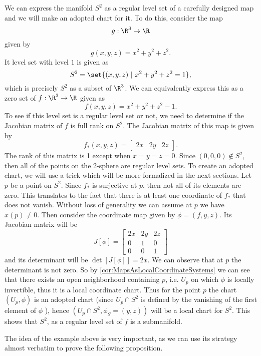 \begin{example}[$ S^2 $ in $ \R^3 $]
	We can express the manifold $ S^2 $ as a regular level set of a carefully designed map and we will make an adopted chart for it. To do this, consider the map
	\[ g: \R^3 \to \R \] 
	given by
	\[ g(x,y,z) = x^2+y^2+z^2 . \]
	It level set with level $ 1 $ is given as
	\[ S^2 = \set{(x,y,z)\ |\ x^2+y^2+z^2 = 1}, \]
	which is precisely $ S^2 $ as a subset of $ \R^3 $. We can equivalently express this as a zero set of $ f: \R^3 \to \R $  given as
	\[ f(x,y,z) = x^2+y^2+z^2 - 1. \]
	To see if this level set is a regular level set or not, we need to determine if the Jacobian matrix of $ f $ is full rank on $ S^2 $. The Jacobian matrix of this map is given by
	\[ f_*(x,y,z) =  \begin{bmatrix}
		2x & 2y & 2z
	\end{bmatrix}. \]
	The rank of this matrix is 1 except when $ x=y=z=0 $. Since $ (0,0,0) \notin S^2 $, then all of the points on the 2-sphere are regular level sets. To create an adopted chart, we will use a trick which will be more formalized in the next sections. Let $ p $ be a point on $ S^2 $. Since $f_*  $ is surjective at $ p $, then not all of its elements are zero. This translates to the fact that there is at least one coordinate of $ f_* $ that does not vanish. Without loss of generality we can assume at $ p $ we have $ x(p) \neq 0 $. Then consider the coordinate map given by $ \phi = (f,y,z) $. Its Jacobian matrix will be
	\[ J[\phi] = \begin{bmatrix}
				2x & 2y & 2z \\
				0 & 1 & 0 \\ 
				0 & 0 & 1
	\end{bmatrix} \]
	and its determinant will be $ \det[J[\phi]] = 2x $. We can observe that at $ p $ the determinant is not zero. So by \autoref{cor:MapsAsLocalCoordinateSystems} we can see that there exists an open neighborhood containing $ p $, i.e. $ U_p $ on which $ \phi $ is locally invertible, thus it is a local coordinate chart. Thus for the point $ p $ the chart $ (U_p,\phi) $ is an adopted chart (since $ U_p\cap S^2 $ is defined by the vanishing of the first element of $ \phi $ ), hence $ (U_p\cap S^2, \phi_S = (y,z)) $ will be a local chart for $ S^2 $. This shows that $ S^2 $, as a regular level set of $ f $ is a submanifold.
\end{example}

The idea of the example above is very important, as we can use its strategy almost verbatim to prove the following proposition.

